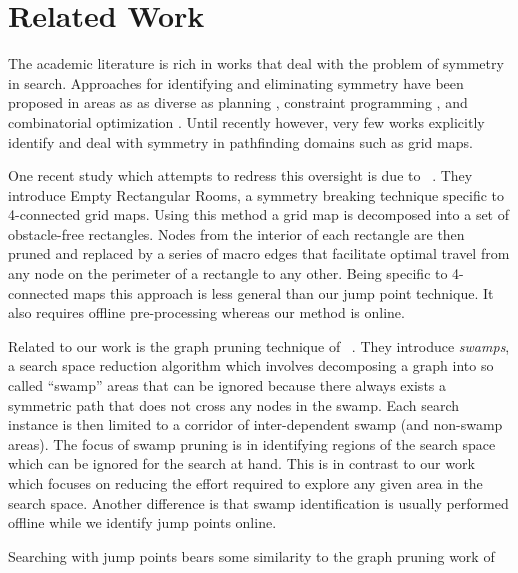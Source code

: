 \section{Related Work}
\label{sec:relatedwork}
The academic literature is rich in works that deal with the problem of symmetry
in search.  Approaches for identifying and eliminating symmetry have been
proposed in areas as as diverse as planning \cite{fox99}, constraint programming
\cite{gent00}, and combinatorial optimization \cite{fukunaga08}. Until recently
however, very few works explicitly identify and deal with symmetry in pathfinding
domains such as grid maps.
\par
One recent study which attempts to redress this oversight is due to
\citeauthor{harabor10}~.  They introduce Empty Rectangular
Rooms, a symmetry breaking technique specific to 4-connected grid maps.  Using
this method a grid map is  decomposed into a set of obstacle-free rectangles.
Nodes from the interior of each rectangle are then pruned and replaced by a
series of macro edges that facilitate optimal travel from any node on the
perimeter of a rectangle to any other.  Being specific to 4-connected maps this
approach is less general than our jump point technique. It also requires offline
pre-processing whereas our method is online.
\par
Related to our work is the graph pruning technique of
\citeauthor{pochter10}~.  They introduce \emph{swamps}, a
search space reduction algorithm which involves decomposing a graph into so
called ``swamp'' areas that can be ignored because there always exists a
symmetric path that does not cross any nodes in the swamp.  Each search instance
is then limited to a corridor of inter-dependent swamp (and non-swamp areas).
The focus of swamp pruning is in identifying regions of
the search space which can be ignored for the search at hand.  This is in
contrast to our work which focuses on reducing the effort required to explore
any given area in the search space.  Another difference is that swamp
identification is usually performed offline while we identify jump points
online.
\par
Searching with jump points bears some similarity to the graph pruning work of
